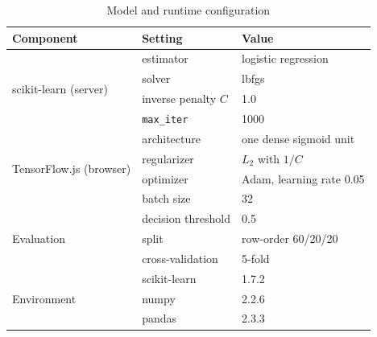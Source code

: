 \begin{table}[t]
\caption{Model and runtime configuration}
\label{tab:t5}
\centering
\footnotesize
\begin{tabular}{@{}lll@{}}
\toprule
Component & Setting & Value \\
\midrule
\multirow{4}{*}{scikit-learn (server)}
  & estimator & logistic regression \\
  & solver & lbfgs \\
  & inverse penalty $C$ & 1.0 \\
  & \texttt{max\_iter} & 1000 \\
\midrule
\multirow{4}{*}{TensorFlow.js (browser)}
  & architecture & one dense sigmoid unit \\
  & regularizer & $L_2$ with $1/C$ \\
  & optimizer & Adam, learning rate 0.05 \\
  & batch size & 32 \\
\midrule
\multirow{3}{*}{Evaluation}
  & decision threshold & 0.5 \\
  & split & row-order 60/20/20 \\
  & cross-validation & 5-fold \\
\midrule
\multirow{3}{*}{Environment}
  & scikit-learn & 1.7.2 \\
  & numpy & 2.2.6 \\
  & pandas & 2.3.3 \\
\bottomrule
\end{tabular}
\end{table}
